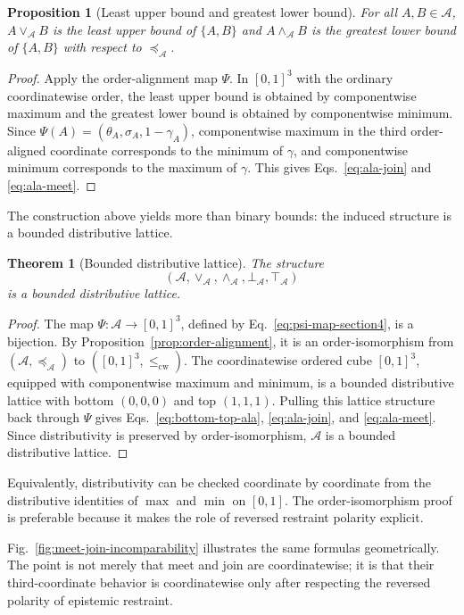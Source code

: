 \documentclass[reqno,final]{amsart}
\theoremstyle{definition}
\theoremstyle{plain}
\newtheorem{proposition}{Proposition}
\newtheorem{theorem}{Theorem}
\theoremstyle{remark}
\providecommand{\cA}{\mathcal{A}}
\providecommand{\preceqA}{\preceq_{\mathcal A}}
\begin{document}
\begin{proposition}[Least upper bound and greatest lower bound]
For all \(A,B\in\cA\), \(A\vee_{\cA}B\) is the least upper bound of \(\{A,B\}\) and \(A\wedge_{\cA}B\) is the greatest lower bound of \(\{A,B\}\) with respect to \(\preceqA\).
\end{proposition}

\begin{proof}
Apply the order-alignment map \(\Psi\). In \([0,1]^3\) with the ordinary coordinatewise order, the least upper bound is obtained by componentwise maximum and the greatest lower bound is obtained by componentwise minimum. Since \(\Psi(A)=(\theta_A,\sigma_A,1-\gamma_A)\), componentwise maximum in the third order-aligned coordinate corresponds to the minimum of \(\gamma\), and componentwise minimum corresponds to the maximum of \(\gamma\). This gives Eqs.~\eqref{eq:ala-join} and \eqref{eq:ala-meet}.
\end{proof}

The construction above yields more than binary bounds: the induced structure is a bounded distributive lattice. 

\begin{theorem}[Bounded distributive lattice]
The structure
\[
(\cA,\vee_{\cA},\wedge_{\cA},\bot_{\cA},\top_{\cA})
\]
is a bounded distributive lattice.
\end{theorem}

\begin{proof}
The map \(\Psi:\cA\to[0,1]^3\), defined by Eq.~\eqref{eq:psi-map-section4}, is a bijection. By Proposition~\ref{prop:order-alignment}, it is an order-isomorphism from \((\cA,\preceqA)\) to \(([0,1]^3,\leq_{\mathrm{cw}})\). The coordinatewise ordered cube \([0,1]^3\), equipped with componentwise maximum and minimum, is a bounded distributive lattice with bottom \((0,0,0)\) and top \((1,1,1)\). Pulling this lattice structure back through \(\Psi\) gives Eqs.~\eqref{eq:bottom-top-ala}, \eqref{eq:ala-join}, and \eqref{eq:ala-meet}. Since distributivity is preserved by order-isomorphism, \(\cA\) is a bounded distributive lattice.
\end{proof}

Equivalently, distributivity can be checked coordinate by coordinate from the distributive identities of \(\max\) and \(\min\) on \([0,1]\). The order-isomorphism proof is preferable because it makes the role of reversed restraint polarity explicit.

Fig.~\ref{fig:meet-join-incomparability} illustrates the same formulas geometrically. The point is not merely that meet and join are coordinatewise; it is that their third-coordinate behavior is coordinatewise only after respecting the reversed polarity of epistemic restraint.
\end{document}
